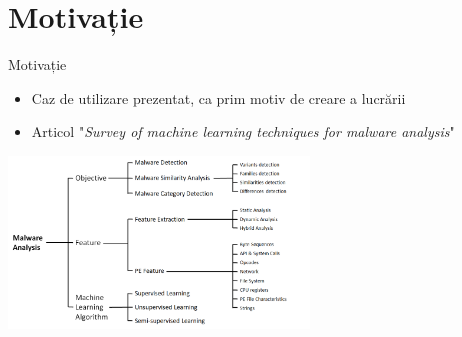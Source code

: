 \section{Motivație}

\begin{frame}{Motivație} \pause
	\begin{itemize}
		\item Caz de utilizare prezentat, ca prim motiv de creare a lucrării \pause
		\item Articol "\textit{Survey of machine learning techniques for malware analysis}"
	\end{itemize}
	
	\vspace*{0.5cm}
	\includegraphics[width=0.6\textwidth, center]{components/images/SotA.png}
	\label{fig:sota}
    \captionsetup{justification=centering,margin=1cm}
\end{frame}


